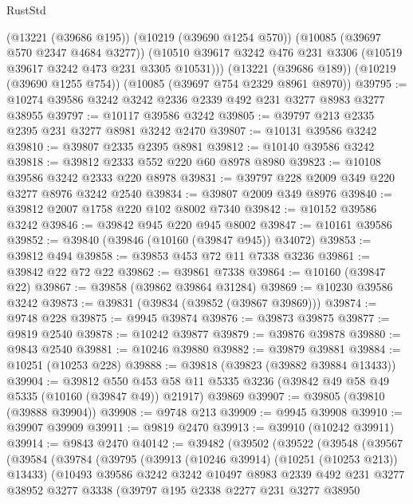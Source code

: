 \begin{lexlean}{RustStd}
\begin{coremodule}
      (@13221 (@39686 @195))
      (@10219 (@39690 @1254 @570))
      (@10085 (@39697 @570 @2347 @4684 @3277))
      (@10510 @39617 @3242 @476 @231 @3306 (@10519 @39617 @3242 @473 @231 @3305 @10531)))
    (@13221 (@39686 @189))
    (@10219 (@39690 @1255 @754))
    (@10085 (@39697 @754 @2329 @8961 @8970))
@39795 := @10274 @39586 @3242 @3242 @2336 @2339 @492 @231 @3277 @8983 @3277 @38955
@39797 := @10117 @39586 @3242
@39805 := @39797 @213 @2335 @2395 @231 @3277 @8981 @3242 @2470
@39807 := @10131 @39586 @3242
@39810 := @39807 @2335 @2395 @8981
@39812 := @10140 @39586 @3242
@39818 := @39812 @2333 @552 @220 @60 @8978 @8980
@39823 := @10108 @39586 @3242 @2333 @220 @8978
@39831 := @39797 @228 @2009 @349 @220 @3277 @8976 @3242 @2540
@39834 := @39807 @2009 @349 @8976
@39840 := @39812 @2007 @1758 @220 @102 @8002 @7340
@39842 := @10152 @39586 @3242
@39846 := @39842 @945 @220 @945 @8002
@39847 := @10161 @39586
@39852 := @39840 (@39846 (@10160 (@39847 @945)) @34072)
@39853 := @39812 @494
@39858 := @39853 @453 @72 @11 @7338 @3236
@39861 := @39842 @22 @72 @22
@39862 := @39861 @7338
@39864 := @10160 (@39847 @22)
@39867 := @39858 (@39862 @39864 @31284)
@39869 := @10230 @39586 @3242
@39873 := @39831 (@39834 (@39852 (@39867 @39869)))
@39874 := @9748 @228
@39875 := @9945 @39874
@39876 := @39873 @39875
@39877 := @9819 @2540
@39878 := @10242 @39877
@39879 := @39876 @39878
@39880 := @9843 @2540
@39881 := @10246 @39880
@39882 := @39879 @39881
@39884 := @10251 (@10253 @228)
@39888 := @39818 (@39823 (@39882 @39884 @13433))
@39904 := @39812
    @550
    @453
    @58
    @11
    @5335
    @3236
    (@39842 @49 @58 @49 @5335 (@10160 (@39847 @49)) @21917)
    @39869
@39907 := @39805 (@39810 (@39888 @39904))
@39908 := @9748 @213
@39909 := @9945 @39908
@39910 := @39907 @39909
@39911 := @9819 @2470
@39913 := @39910 (@10242 @39911)
@39914 := @9843 @2470
@40142 := @39482
    (@39502
      (@39522
        (@39548
          (@39567
            (@39584
              (@39784
                (@39795
                  (@39913 (@10246 @39914) (@10251 (@10253 @213)) @13433)
                  (@10493
                    @39586
                    @3242
                    @3242
                    @10497
                    @8983
                    @2339
                    @492
                    @231
                    @3277
                    @38952
                    @3277
                    @3338
                    (@39797
                      @195
                      @2338
                      @2277
                      @231
                      @3277
                      @38950

\end{coremodule}
\end{lexlean}
